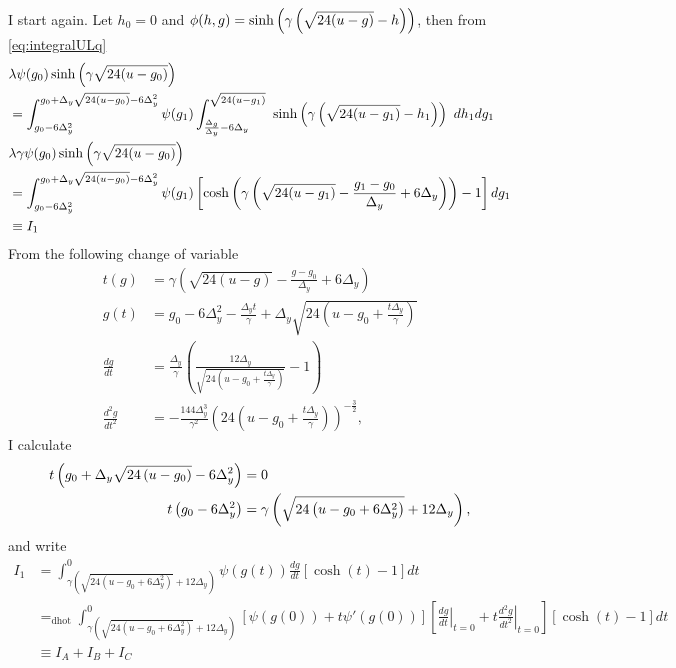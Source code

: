 \documentclass[]{article}
\newcommand{\dhot}{=_{\text{dhot}}}
\begin{document}
I start again.  Let $h_0=0$ and $\phi(h,g)=\phiHG{h}{g}$, then from
\eqref{eq:integralULq}
\renewcommand{\LgQ}{g_0 - 6\Delta_y^2}
\begin{align}
  & \lambda \psi(g_0) \sinh\left(\gamma \sqrt{24(u-g_0)} \right) \nonumber \\
  &= \int_{\LgQ}^{\UgQ} \psi(g_1) \int_{\LhQ}^{\Uh}~ \phiHG{h_1}{g_1}
  ~dh_1 dg_1 \nonumber \\
  & \lambda \gamma \psi(g_0) \sinh\left(\gamma \sqrt{24(u-g_0)}
  \right) \nonumber \\
  \label{eq:Ione}
  &= \int_{\LgQ}^{\UgQ} \psi(g_1) \left[ \cosh \left(
      \gamma \left( \sqrt{24(u-g_1)} - \frac{g_1 - g_0}{\Delta_y} + 6
        \Delta_y \right) \right) -1 \right] dg_1 \\
  &\equiv I_1 \nonumber
\end{align}
From the following change of variable
\begin{align*}
   t(g) &= \gamma \left( \sqrt{24(u-g)} - \frac{g - g_0}{\Delta_y} +
     6 \Delta_y \right)\\
   g(t) &= g_0 - 6 \Delta_y^2 - \frac{\Delta_y t}{\gamma} +
   \Delta_y \sqrt{24 \left( u-g_0 + \frac{t\Delta_y}{\gamma} \right)} \\
   \frac{d g}{ dt} &= \frac{\Delta_y}{\gamma} \left( \frac{12 \Delta_y} {
       \sqrt{ 24 \left( u - g_0 + \frac{t \Delta_y}{\gamma} \right) }}
     - 1 \right) \\
   \frac{d^2 g}{ dt^2} &= -\frac{144 \Delta_y^3}{\gamma^2}
   \left( 24
     \left( u - g_0 + \frac{t \Delta_y}{\gamma} \right)
   \right)^{-\frac{3}{2}},
\end{align*}
I calculate
\begin{align*}
  t \left( \UgQ \right) &= 0 \\
  t \left( \LgQ \right) &= \gamma \left(
    \sqrt{24\left( u - g_0 + 6 \Delta_y^2 \right) } + 12 \Delta_y \right),
\end{align*}
and write
\newcommand{\LOW}{{\gamma \left( \sqrt{24(u- g_0 + 6\Delta_y^2 )} +
      12\Delta_y \right)}}
\newcommand{\RANGE}{_\LOW ^0}
\newcommand{\INT}{\int\RANGE}
\begin{align*}
  I_1 &= \INT \psi(g(t)) \frac{d g}{d t} [\cosh(t) -1] dt \\
  &\dhot \INT \left[ \psi(g(0)) + t \psi'(g(0)) \right]
  \left[ \left. \frac{d g}{d t} \right|_{t=0}
    + t \left. \frac{d^2g}{d t^2} \right|_{t=0}
  \right]
  [\cosh(t) -1] dt \\
  &\equiv I_{A} +  I_{B} +  I_{C}
\end{align*}
\end{document}
